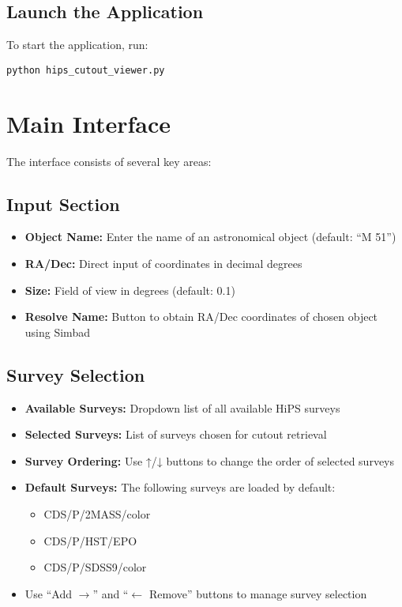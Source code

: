 \documentclass{article}
\begin{document}
\subsection{Launch the Application}
To start the application, run:
\begin{verbatim}
python hips_cutout_viewer.py
\end{verbatim}

\section{Main Interface}
The interface consists of several key areas:

\subsection{Input Section}
\begin{itemize}
    \item \textbf{Object Name:} Enter the name of an astronomical object (default: ``M 51'')
    \item \textbf{RA/Dec:} Direct input of coordinates in decimal degrees
    \item \textbf{Size:} Field of view in degrees (default: 0.1)
    \item \textbf{Resolve Name:} Button to obtain RA/Dec coordinates of chosen object using Simbad
\end{itemize}

\subsection{Survey Selection}
\begin{itemize}
    \item \textbf{Available Surveys:} Dropdown list of all available HiPS surveys
    \item \textbf{Selected Surveys:} List of surveys chosen for cutout retrieval
    \item \textbf{Survey Ordering:} Use ↑/↓ buttons to change the order of selected surveys
    \item \textbf{Default Surveys:} The following surveys are loaded by default:
        \begin{itemize}
            \item CDS/P/2MASS/color
            \item CDS/P/HST/EPO
            \item CDS/P/SDSS9/color
        \end{itemize}
    \item Use ``Add $\rightarrow$'' and ``$\leftarrow$ Remove'' buttons to manage survey selection
\end{itemize}
\end{document}
